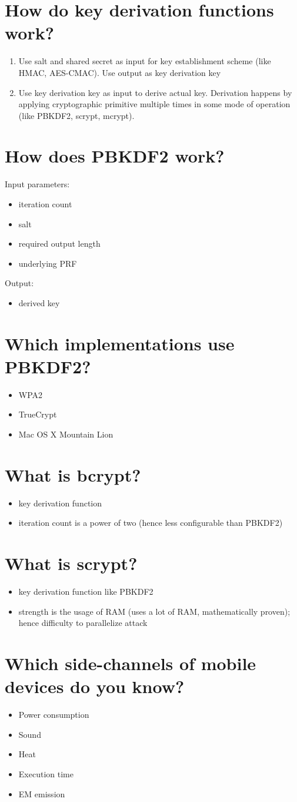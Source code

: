 \documentclass[twocolumn]{article}
\newcommand{\question}[1]{\section{#1}}
\begin{document}
\question{How do key derivation functions work?}
%
\begin{enumerate}
  \item Use salt and shared secret as input for key establishment scheme (like HMAC, AES-CMAC). Use output as key derivation key
  \item Use key derivation key as input to derive actual key. Derivation happens by applying cryptographic primitive multiple times in some mode of operation (like PBKDF2, scrypt, mcrypt).
\end{enumerate}

\question{How does PBKDF2 work?}
%
Input parameters:
\begin{itemize}
  \item iteration count
  \item salt
  \item required output length
  \item underlying PRF
\end{itemize}

Output:
\begin{itemize}
  \item derived key
\end{itemize}

\question{Which implementations use PBKDF2?}
%
\begin{itemize}
  \item WPA2
  \item TrueCrypt
  \item Mac OS X Mountain Lion
\end{itemize}

\question{What is bcrypt?}
%
\begin{itemize}
  \item key derivation function
  \item iteration count is a power of two (hence less configurable than PBKDF2)
\end{itemize}

\question{What is scrypt?}
%
\begin{itemize}
  \item key derivation function like PBKDF2
  \item strength is the usage of RAM (uses a lot of RAM, mathematically proven); hence difficulty to parallelize attack
\end{itemize}

\question{Which side-channels of mobile devices do you know?}
%
\begin{itemize}
  \item Power consumption
  \item Sound
  \item Heat
  \item Execution time
  \item EM emission
\end{itemize}
\end{document}
